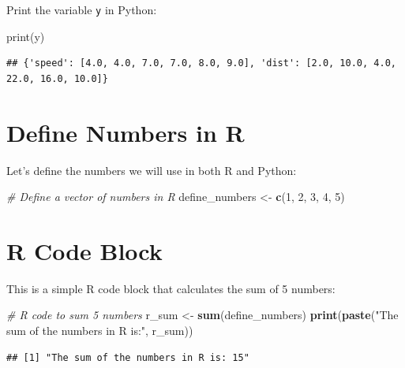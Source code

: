 \documentclass[
  12 pt,
  a4paper,
]{book}
\newenvironment{Shaded}{\begin{snugshade}}{\end{snugshade}}
\newcommand{\BuiltInTok}[1]{#1}
\newcommand{\CommentTok}[1]{\textcolor[rgb]{0.56,0.35,0.01}{\textit{#1}}}
\newcommand{\DecValTok}[1]{\textcolor[rgb]{0.00,0.00,0.81}{#1}}
\newcommand{\FunctionTok}[1]{\textcolor[rgb]{0.13,0.29,0.53}{\textbf{#1}}}
\newcommand{\NormalTok}[1]{#1}
\newcommand{\OtherTok}[1]{\textcolor[rgb]{0.56,0.35,0.01}{#1}}
\newcommand{\StringTok}[1]{\textcolor[rgb]{0.31,0.60,0.02}{#1}}
\numberwithin{equation}{section}
\theoremstyle{plain}      %
\theoremstyle{definition} %
\theoremstyle{remark}     %
\theoremstyle{note}         %
\begin{document}
Print the variable \texttt{y} in Python:

\begin{Shaded}
\begin{Highlighting}[]
\BuiltInTok{print}\NormalTok{(y)}
\end{Highlighting}
\end{Shaded}

\begin{verbatim}
## {'speed': [4.0, 4.0, 7.0, 7.0, 8.0, 9.0], 'dist': [2.0, 10.0, 4.0, 22.0, 16.0, 10.0]}
\end{verbatim}

\newpage

\hypertarget{define-numbers-in-r}{%
\section{Define Numbers in R}\label{define-numbers-in-r}}

Let's define the numbers we will use in both R and Python:

\begin{Shaded}
\begin{Highlighting}[]
\CommentTok{\# Define a vector of numbers in R}
\NormalTok{define\_numbers }\OtherTok{\textless{}{-}} \FunctionTok{c}\NormalTok{(}\DecValTok{1}\NormalTok{, }\DecValTok{2}\NormalTok{, }\DecValTok{3}\NormalTok{, }\DecValTok{4}\NormalTok{, }\DecValTok{5}\NormalTok{)}
\end{Highlighting}
\end{Shaded}

\hypertarget{r-code-block}{%
\section{R Code Block}\label{r-code-block}}

This is a simple R code block that calculates the sum of 5 numbers:

\begin{Shaded}
\begin{Highlighting}[]
\CommentTok{\# R code to sum 5 numbers}
\NormalTok{r\_sum }\OtherTok{\textless{}{-}} \FunctionTok{sum}\NormalTok{(define\_numbers)}
\FunctionTok{print}\NormalTok{(}\FunctionTok{paste}\NormalTok{(}\StringTok{"The sum of the numbers in R is:"}\NormalTok{, r\_sum))}
\end{Highlighting}
\end{Shaded}

\begin{verbatim}
## [1] "The sum of the numbers in R is: 15"
\end{verbatim}
\end{document}
